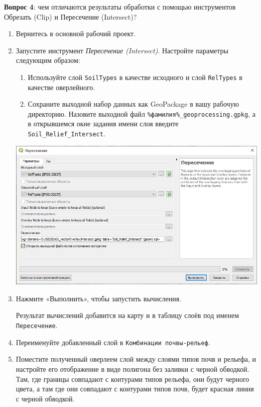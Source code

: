 \documentclass[
  12pt,
]{book}
\providecommand{\tightlist}{%
  \setlength{\itemsep}{0pt}\setlength{\parskip}{0pt}}
\begin{document}
\textbf{Вопрос 4}: чем отличаются результаты обработки с помощью инструментов Обрезать (Clip) и Пересечение (Intersect)?

\begin{enumerate}
\def\labelenumi{\arabic{enumi}.}
\item
  Вернитесь в основной рабочий проект.
\item
  Запустите инструмент \emph{Пересечение (Intersect)}. Настройте параметры следующим образом:

  \begin{enumerate}
  \def\labelenumii{\arabic{enumii}.}
  \tightlist
  \item
    Используйте слой \texttt{SoilTypes} в качестве исходного и слой \texttt{RelTypes} в качестве оверлейного.\\
  \item
    Сохраните выходной набор данных как GeoPackage в вашу рабочую директорию. Назовите выходной файл \texttt{\%фамилия\%\_geoprocessing.gpkg}, а в открывшемся окне задания имени слоя введите \texttt{Soil\_Relief\_Intersect}.
  \end{enumerate}

  \includegraphics{images/Ex06/overlay2.png}
\item
  Нажмите «Выполнить», чтобы запустить вычисления.

  Результат вычислений добавится на карту и в таблицу слоёв под именем \texttt{Пересечение}.
\item
  Переименуйте добавленный слой в \texttt{Комбинации\ почвы-рельеф}.
\item
  Поместите полученный оверлеем слой между слоями типов почв и рельефа, и настройте его отображение в виде полигона без заливки с черной обводкой. Там, где границы совпадают с контурами типов рельефа, они будут черного цвета, а там где они совпадают с контурами типов почв, будет красная линия с черной обводкой.


\end{enumerate}
\end{document}
